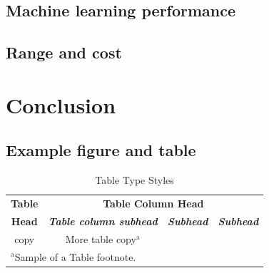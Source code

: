 \documentclass[conference]{IEEEtran}
\begin{document}
\subsection{Machine learning performance}

\subsection{Range and cost}

\section{Conclusion}\label{CONC}

\subsection{Example figure and table}\label{FAT}

\begin{table}[htbp]
\caption{Table Type Styles}
\begin{center}
\begin{tabular}{|c|c|c|c|}
\hline
\textbf{Table}&\multicolumn{3}{|c|}{\textbf{Table Column Head}} \\
\cline{2-4} 
\textbf{Head} & \textbf{\textit{Table column subhead}}&
\textbf{\textit{Subhead}}& \textbf{\textit{Subhead}} \\
\hline
copy& More table copy$^{\mathrm{a}}$& &  \\
\hline
\multicolumn{4}{l}{$^{\mathrm{a}}$Sample of a Table footnote.}
\end{tabular}
\label{tab1}
\end{center}
\end{table}



\end{document}
